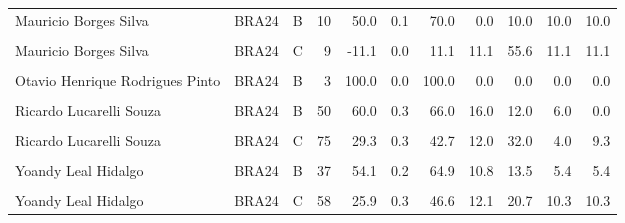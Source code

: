 \documentclass[
]{book}
\begin{document}
\begin{table}[!h]
{\begin{tabular}[t]{lllrrrrrrrr}
\addlinespace
Mauricio Borges Silva & BRA24 & B & 10 & 50.0 & 0.1 & 70.0 & 0.0 & 10.0 & 10.0 & 10.0\\
\cellcolor{gray!10}{Mauricio Borges Silva} & \cellcolor{gray!10}{BRA24} & \cellcolor{gray!10}{Bm} & \cellcolor{gray!10}{8} & \cellcolor{gray!10}{50.0} & \cellcolor{gray!10}{0.1} & \cellcolor{gray!10}{62.5} & \cellcolor{gray!10}{12.5} & \cellcolor{gray!10}{12.5} & \cellcolor{gray!10}{0.0} & \cellcolor{gray!10}{12.5}\\
Mauricio Borges Silva & BRA24 & C & 9 & -11.1 & 0.0 & 11.1 & 11.1 & 55.6 & 11.1 & 11.1\\
\cellcolor{gray!10}{Otavio Henrique Rodrigues Pinto} & \cellcolor{gray!10}{BRA24} & \cellcolor{gray!10}{A} & \cellcolor{gray!10}{1} & \cellcolor{gray!10}{-100.0} & \cellcolor{gray!10}{0.0} & \cellcolor{gray!10}{0.0} & \cellcolor{gray!10}{0.0} & \cellcolor{gray!10}{0.0} & \cellcolor{gray!10}{0.0} & \cellcolor{gray!10}{100.0}\\
Otavio Henrique Rodrigues Pinto & BRA24 & B & 3 & 100.0 & 0.0 & 100.0 & 0.0 & 0.0 & 0.0 & 0.0\\
\addlinespace
\cellcolor{gray!10}{Ricardo Lucarelli Souza} & \cellcolor{gray!10}{BRA24} & \cellcolor{gray!10}{A} & \cellcolor{gray!10}{40} & \cellcolor{gray!10}{57.5} & \cellcolor{gray!10}{0.3} & \cellcolor{gray!10}{67.5} & \cellcolor{gray!10}{15.0} & \cellcolor{gray!10}{7.5} & \cellcolor{gray!10}{0.0} & \cellcolor{gray!10}{10.0}\\
Ricardo Lucarelli Souza & BRA24 & B & 50 & 60.0 & 0.3 & 66.0 & 16.0 & 12.0 & 6.0 & 0.0\\
\cellcolor{gray!10}{Ricardo Lucarelli Souza} & \cellcolor{gray!10}{BRA24} & \cellcolor{gray!10}{Bm} & \cellcolor{gray!10}{57} & \cellcolor{gray!10}{33.3} & \cellcolor{gray!10}{0.3} & \cellcolor{gray!10}{50.9} & \cellcolor{gray!10}{10.5} & \cellcolor{gray!10}{21.1} & \cellcolor{gray!10}{14.0} & \cellcolor{gray!10}{3.5}\\
Ricardo Lucarelli Souza & BRA24 & C & 75 & 29.3 & 0.3 & 42.7 & 12.0 & 32.0 & 4.0 & 9.3\\
\cellcolor{gray!10}{Yoandy Leal Hidalgo} & \cellcolor{gray!10}{BRA24} & \cellcolor{gray!10}{A} & \cellcolor{gray!10}{45} & \cellcolor{gray!10}{51.1} & \cellcolor{gray!10}{0.3} & \cellcolor{gray!10}{62.2} & \cellcolor{gray!10}{2.2} & \cellcolor{gray!10}{24.4} & \cellcolor{gray!10}{6.7} & \cellcolor{gray!10}{4.4}\\
\addlinespace
Yoandy Leal Hidalgo & BRA24 & B & 37 & 54.1 & 0.2 & 64.9 & 10.8 & 13.5 & 5.4 & 5.4\\
\cellcolor{gray!10}{Yoandy Leal Hidalgo} & \cellcolor{gray!10}{BRA24} & \cellcolor{gray!10}{Bm} & \cellcolor{gray!10}{57} & \cellcolor{gray!10}{35.1} & \cellcolor{gray!10}{0.3} & \cellcolor{gray!10}{49.1} & \cellcolor{gray!10}{12.3} & \cellcolor{gray!10}{24.6} & \cellcolor{gray!10}{8.8} & \cellcolor{gray!10}{5.3}\\
Yoandy Leal Hidalgo & BRA24 & C & 58 & 25.9 & 0.3 & 46.6 & 12.1 & 20.7 & 10.3 & 10.3\\
\bottomrule
\end{tabular}}
\end{table}
\end{document}
